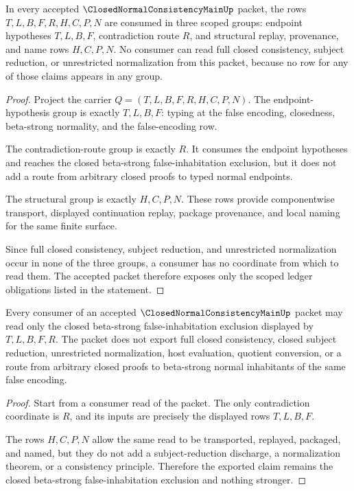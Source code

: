 \begin{theorem}
\label{thm:closed-normal-consistency-main-ledger-obligation-scope}
In every accepted $\ClosedNormalConsistencyMainUp$ packet, the rows $T,L,B,F,R,H,C,P,N$ are consumed in three scoped groups: endpoint hypotheses $T,L,B,F$, contradiction route $R$, and structural replay, provenance, and name rows $H,C,P,N$. No consumer can read full closed consistency, subject reduction, or unrestricted normalization from this packet, because no row for any of those claims appears in any group.
\end{theorem}
\begin{proof}
Project the carrier $Q=(T,L,B,F,R,H,C,P,N)$. The endpoint-hypothesis group is exactly $T,L,B,F$: typing at the false encoding, closedness, beta-strong normality, and the false-encoding row.

The contradiction-route group is exactly $R$. It consumes the endpoint hypotheses and reaches the closed beta-strong false-inhabitation exclusion, but it does not add a route from arbitrary closed proofs to typed normal endpoints.

The structural group is exactly $H,C,P,N$. These rows provide componentwise transport, displayed continuation replay, package provenance, and local naming for the same finite surface.

Since full closed consistency, subject reduction, and unrestricted normalization occur in none of the three groups, a consumer has no coordinate from which to read them. The accepted packet therefore exposes only the scoped ledger obligations listed in the statement.
\end{proof}

\begin{theorem}
\label{thm:closed-normal-consistency-main-positive-boundary}
Every consumer of an accepted $\ClosedNormalConsistencyMainUp$ packet may read only the closed beta-strong false-inhabitation exclusion displayed by $T,L,B,F,R$. The packet does not export full closed consistency, closed subject reduction, unrestricted normalization, host evaluation, quotient conversion, or a route from arbitrary closed proofs to beta-strong normal inhabitants of the same false encoding.
\end{theorem}
\begin{proof}
Start from a consumer read of the packet. The only contradiction coordinate is $R$, and its inputs are precisely the displayed rows $T,L,B,F$.

The rows $H,C,P,N$ allow the same read to be transported, replayed, packaged, and named, but they do not add a subject-reduction discharge, a normalization theorem, or a consistency principle. Therefore the exported claim remains the closed beta-strong false-inhabitation exclusion and nothing stronger.
\end{proof}

